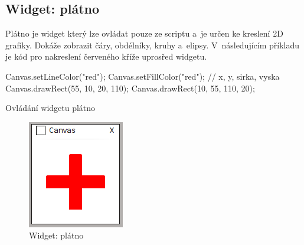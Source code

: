 \documentclass[12pt, a4paper, oneside]{article}
\begin{document}
\subsection{Widget: plátno}
Plátno je widget který lze ovládat pouze ze scriptu a~je určen ke kreslení 2D grafiky. Dokáže zobrazit čáry, obdélníky, kruhy a~elipsy. V~následujícím příkladu je kód pro nakreslení červeného kříže uprosřed widgetu.
\begin{listing}[H]
\begin{jscode}
Canvas.setLineColor("red");
Canvas.setFillColor("red");
// x, y, sirka, vyska
Canvas.drawRect(55, 10, 20, 110);
Canvas.drawRect(10, 55, 110, 20);
\end{jscode}
\caption{Ovládání widgetu plátno}
\end{listing}

\begin{figure}[h]
\begin{center}
\includegraphics[scale=1]{img/w_canvas.png}
\caption{Widget: plátno}
\end{center}
\end{figure}
\end{document}
